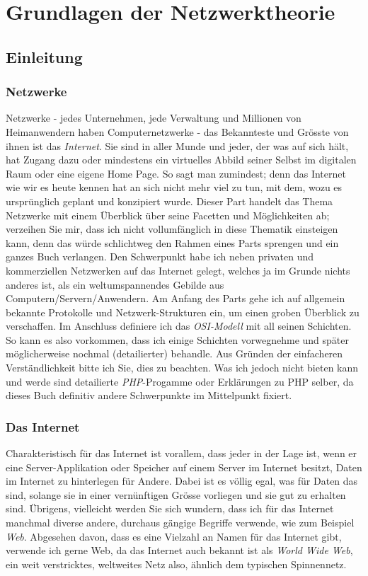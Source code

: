 \documentclass[b5paper,10pt,dvips,fleqn,titlepage,twoside]{book}
\begin{document}
\part{Grundlagen der Netzwerktheorie}
\label{part:network}
\chapter{Einleitung}
\section{Netzwerke}
Netzwerke - jedes Unternehmen, jede Verwaltung und Millionen von Heimanwendern haben Computernetzwerke - das Bekannteste und Grösste von ihnen ist das \emph{Internet}. Sie sind in aller Munde und jeder, der was auf sich hält, hat Zugang dazu oder mindestens ein virtuelles Abbild seiner Selbst im digitalen Raum oder eine eigene Home Page. So sagt man zumindest; denn das Internet wie wir es heute kennen hat an sich nicht mehr viel zu tun, mit dem, wozu es ursprünglich geplant und konzipiert wurde.\newline
Dieser Part handelt das Thema Netzwerke mit einem Überblick über seine Facetten und Möglichkeiten ab; verzeihen Sie mir, dass ich nicht vollumfänglich in diese Thematik einsteigen kann, denn das würde schlichtweg den Rahmen eines Parts sprengen und ein ganzes Buch verlangen.
Den Schwerpunkt habe ich neben privaten und kommerziellen Netzwerken auf das Internet gelegt, welches ja im Grunde nichts anderes ist, als ein weltumspannendes Gebilde aus Computern/Servern/Anwendern. 
Am Anfang des Parts gehe ich auf allgemein bekannte Protokolle und Netzwerk-Strukturen ein, um einen groben Überblick zu verschaffen. Im Anschluss definiere ich das \emph{OSI-Modell} mit all seinen Schichten. So kann es also vorkommen, dass ich einige Schichten vorwegnehme und später möglicherweise nochmal (detailierter) behandle. Aus Gründen der einfacheren Verständlichkeit bitte ich Sie, dies zu beachten.
Was ich jedoch nicht bieten kann und werde sind detailierte \emph{PHP}-Progamme oder Erklärungen zu PHP selber, da dieses Buch definitiv andere Schwerpunkte im Mittelpunkt fixiert.

\section{Das Internet}
Charakteristisch für das Internet ist vorallem, dass jeder in der Lage ist, wenn er eine Server-Applikation oder Speicher auf einem Server im Internet besitzt, Daten im Internet zu hinterlegen für Andere. Dabei ist es völlig egal, was für Daten das sind, solange sie in einer vernünftigen Grösse vorliegen und sie gut zu erhalten sind. \newline
Übrigens, vielleicht werden Sie sich wundern, dass ich für das Internet manchmal diverse andere, durchaus gängige Begriffe verwende, wie zum Beispiel \emph{Web}. Abgesehen davon, dass es eine Vielzahl an Namen für das Internet gibt, verwende ich gerne Web, da das Internet auch bekannt ist als \emph{World Wide Web}, ein weit verstricktes, weltweites Netz also, ähnlich dem typischen Spinnennetz.
\end{document}
